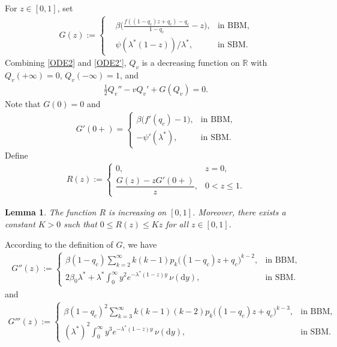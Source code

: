 \documentclass[11pt]{article}
\newtheorem{lemma}[thrm]{Lemma}
\numberwithin{equation}{section}
\def\proof{\noindent{\it Proof.~}}
\begin{document}
For $z\in [0,1]$, set 
\begin{align*}
	G(z) :=  
	\left\{
	\begin{aligned}
		&\beta\big( \frac{f((1-q_c)z+q_c)-q_c}{1-q_c} -z\big), &  \mbox{in BBM},\\
		&\psi(\lambda^*(1-z))/\lambda^*, & \mbox{in SBM}.
	\end{aligned}
	\right.
\end{align*}
Combining \eqref{ODE2} and \eqref{ODE2'}, $Q_v$ is a decreasing function on $\mathbb{R}$ with $Q_v(+\infty) = 0$, $Q_v(-\infty) = 1$, and
\begin{align}\label{ODE3}
	\frac{1}{2} Q_v'' - v Q_v' + G(Q_v) = 0.
\end{align}
Note that $G(0) = 0$ and 
\begin{align}\label{Def-of-G-prime}
	G'(0+) = 
	\begin{cases}
		\beta\bigl(f'(q_c) - 1\bigr), & \text{in BBM},\\[4pt]
		-\psi'(\lambda^*), & \text{in SBM}.
	\end{cases}
\end{align}
Define
\begin{align}\label{Def-of-R}
	R(z) := 
	\begin{cases}
		0, & z = 0,\\[4pt]
		\dfrac{G(z) - z G'(0+)}{z}, & 0 < z \le 1.
	\end{cases}
\end{align}
\begin{lemma}\label{lem1}
The function $R$ is increasing on $[0,1]$. Moreover, there exists a constant $K > 0$ such that $0 \leq R(z) \leq K z$ for all $z \in [0,1]$.
\end{lemma}
\proof 
According to the definition of $G$, we have
\begin{align*}
	G''(z) := 
	\begin{cases}
		\beta(1 - q_c) \displaystyle \sum_{k=2}^\infty k(k-1)p_k\bigl((1 - q_c)z + q_c\bigr)^{k-2}, & \text{in BBM},\\[8pt]
		2\beta_0\lambda^*+\lambda^* \displaystyle \int_0^\infty y^2 e^{-\lambda^*(1 - z)y} \, \nu(\mathrm{d}y), & \text{in SBM}.
	\end{cases}
\end{align*}
and 
\begin{align*}
	G'''(z) := 
	\begin{cases}
		\beta(1 - q_c)^2 \displaystyle \sum_{k=3}^\infty k(k-1)(k-2)p_k \bigl((1 - q_c)z + q_c\bigr)^{k-3}, & \text{in BBM},\\[8pt]
		(\lambda^*)^2 \displaystyle \int_0^\infty y^3 e^{-\lambda^*(1 - z)y} \, \nu(\mathrm{d}y), & \text{in SBM}.
	\end{cases}
\end{align*}
\end{document}
